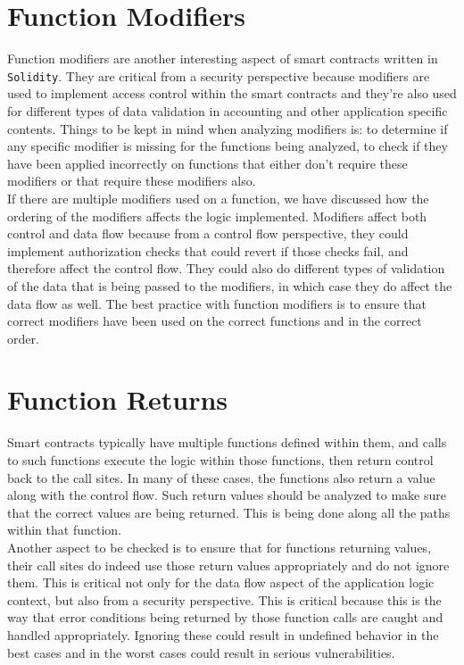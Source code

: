 \section{Function Modifiers}
Function modifiers are another interesting aspect of smart contracts written in \verb|Solidity|. They are critical from a security perspective because modifiers are used to implement access control within the smart contracts and they're also used for different types of data validation in accounting and other application specific contents. Things to be kept in mind when analyzing modifiers is: to determine if any specific modifier is missing for the functions being analyzed, to check if they have been applied incorrectly on functions that either don't require these modifiers or that require these modifiers also.\\ 
If there are multiple modifiers used on a function, we have discussed how the ordering of the modifiers affects the logic implemented. Modifiers affect both control and data flow because from a control flow perspective, they could implement authorization checks that could revert if those checks fail, and therefore affect the control flow. They could also do different types of validation of the data that is being passed to the modifiers, in which case they do affect the data flow as well. The best practice with function modifiers is to ensure that correct modifiers have been used on the correct functions and in the correct order.

\section{Function Returns}
Smart contracts typically have multiple functions defined within them, and calls to such functions execute the logic within those functions, then return control back to the call sites. In many of these cases, the functions also return a value along with the control flow. Such return values should be analyzed to make sure that the correct values are being returned. This is being done along all the paths within that function.\\

Another aspect to be checked is to ensure that for functions returning values, their call sites do indeed use those return values appropriately and do not ignore them. This is critical not only for the data flow aspect of the application logic context, but also from a security perspective. This is critical because this is the way that error conditions being returned by those function calls are caught and handled appropriately. Ignoring these could result in undefined behavior in the best cases and in the worst cases could result in serious vulnerabilities.


